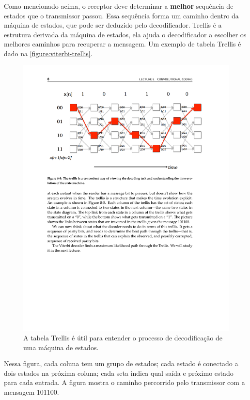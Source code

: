 	Como mencionado acima, o receptor deve determinar a \textbf{melhor} sequência de estados que o transmissor passou. Essa sequência forma um caminho dentro da máquina de estados, que pode ser deduzido pelo decodificador. Trellis é a estrutura derivada da máquina de estados, ela ajuda o decodificador a escolher os melhores caminhos para recuperar a mensagem. Um exemplo de tabela Trellis é dado na \autoref{figure:viterbi-trellis}.
	\begin{figure}[htb]
		\caption{\label{figure:viterbi-trellis}A tabela Trellis é útil para entender o processo de decodificação de uma máquina de estados.}
		\centering
		\includegraphics[width=0.6\textheight,trim={0cm 18cm 0cm 2.5cm},clip]{viterbi/trellis.pdf}
	\end{figure}
	Nessa figura, cada coluna tem um grupo de estados; cada estado é conectado a dois estados na próxima coluna; cada seta indica qual saída e próximo estado para cada entrada. A figura mostra o caminho percorrido pelo transmissor com a mensagem 101100. 
	
